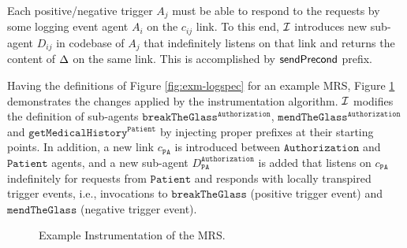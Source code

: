 Each positive/negative trigger $A_j$ must be able to respond to the requests by some logging event agent $A_i$ on the $c_{ij}$ link. To this end, $\mathcal{I}$ introduces new sub-agent $D_{ij}$ in codebase of $A_j$ that indefinitely listens on that link and returns the content of $\Delta$ on the same link. This is accomplished by $\mathsf{sendPrecond}$ prefix.

Having the definitions of Figure \ref{fig:exm-logspec} for an example MRS, Figure \ref{fig:exm-inst} demonstrates the changes applied by the instrumentation algorithm.  $\mathcal{I}$ modifies the definition of sub-agents  $\mathtt{breakTheGlass}^{\mathtt{Authorization}}$, $\mathtt{mendTheGlass}^{\mathtt{Authorization}}$ and $\mathtt{getMedicalHistory}^{\mathtt{Patient}}$ by injecting proper prefixes at their starting points. In addition, a new link $c_{\mathtt{PA}}$ is introduced between $\mathtt{Authorization}$ and $\mathtt{Patient}$ agents, and a new sub-agent  $D_{\mathtt{PA}}^{\mathtt{Authorization}}$ is added that listens on $c_{\mathtt{PA}}$ indefinitely for requests from  $\mathtt{Patient}$ and responds with locally transpired trigger events, i.e., invocations to $\mathtt{breakTheGlass}$ (positive trigger event) and $\mathtt{mendTheGlass}$ (negative trigger event).


\begin{figure}
\setlength{\fboxsep}{0pt}%
\caption{Example Instrumentation of the MRS.}
\label{fig:exm-inst}
\end{figure}

